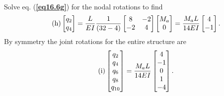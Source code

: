 \documentclass{AeroStructure-ERJohnson}
\begin{document}
\begin{example}
\begin{align}
\end{align}
Solve eq. (\textbf{\ref{eq16.6g}}) for the nodal rotations to find
\begin{align}\label{eq16.6h}\tag{h}
\left[\begin{array}{@{}l@{}}q_{2} \\q_{4}\end{array}\right]=\frac{L}{E I} \frac{1}{(32-4)}\left[\begin{array}{@{}cc@{}}8 & -2 \\-2 & 4\end{array}\right]\left[\begin{array}{@{}c@{}}M_{a} \\0\end{array}\right]=\frac{M_{a} L}{14 E I}\left[\begin{array}{@{}c@{}}4 \\-1\end{array}\right].
\end{align}
By symmetry the joint rotations for the entire structure are
\begin{align}\label{eq16.6i}\tag{i}
\left[\begin{array}{@{}c@{}}q_{2} \\q_{4} \\q_{6} \\q_{8} \\q_{10}\end{array}\right]=\frac{M_{a} L}{14 E I}\left[\begin{array}{@{}c@{}}4 \\-1 \\0 \\1 \\-4\end{array}\right].
\end{align}

\end{example}
\end{document}
